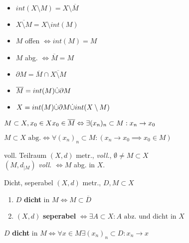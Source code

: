 \begin{itemize}
  \item $int(X\setminus M) = X \setminus \overline{M}$
  \item $\overline{X \setminus M} = X \setminus int(M)$
  \item $M$ offen $\Leftrightarrow int(M) = M$
  \item $M$ abg. $\Leftrightarrow \overline{M} = M$
  \item $\partial M = \overline{M} \cap \overline{X\setminus M}$
  \item $\overline{M} = int(M) \dot{\cup} \partial M$
  \item $X = int(M) \dot{\cup} \partial M \dot{\cup} int(X \setminus M)$
\end{itemize}
\heel

\begin{lemma}
  $M \subset X, x_0 \in X\\ x_0 \in \overline{M} \Leftrightarrow
  \exists (x_n)_n \subset M: x_n \to x_0$
\end{lemma}

\begin{korrolar}
  $M \subset X \text{ abg.} \Leftrightarrow \forall (x_n)_n \subset M:
  {(x_n \to x_0 \implies x_0 \in M)}$
\end{korrolar}

\begin{satz}{voll. Teilraum}
  $(X,d)$ metr., \textit{voll.}, $\emptyset \neq M \subset X$\\
  $(M,d_{|M})$ \textit{voll.} $\Leftrightarrow M$ abg. in $X$.
\end{satz}

\dheel

\begin{definition}{Dicht, seperabel}
  $(X,d)$ metr., $D,M \subset X$
  \begin{enumerate}[label = (\arabic*)]
    \item $D$ \textbf{dicht} in $M \Leftrightarrow M \subset \overline{D}$
    \item $(X,d)$ \textbf{seperabel} $\Leftrightarrow \exists A \subset X:
    A \text{ abz. und dicht in }X$
  \end{enumerate}
\end{definition}

\begin{korrolar}
  $D$ \textbf{dicht} in $M \Leftrightarrow \forall x
  \in M \exists (x_n)_n \subset D: x_n \to x$
\end{korrolar}

